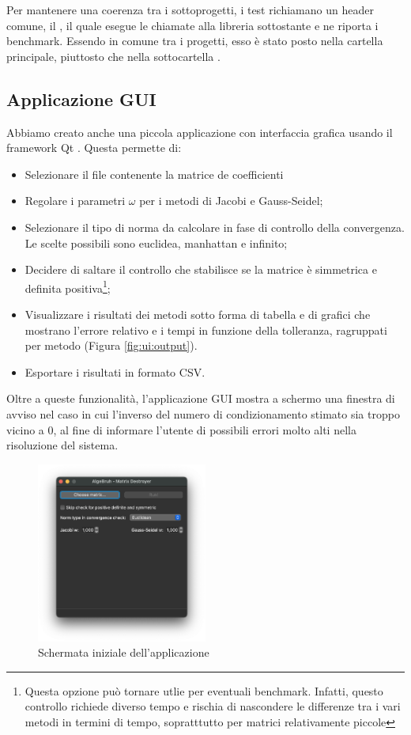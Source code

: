 Per mantenere una coerenza tra i sottoprogetti, i test richiamano un header comune, il , il quale esegue le chiamate alla libreria sottostante e ne riporta i benchmark. Essendo in comune tra i progetti, esso è stato posto nella cartella principale, piuttosto che nella sottocartella .


\subsection{Applicazione GUI}
Abbiamo creato anche una piccola applicazione con interfaccia grafica usando il framework Qt \cite{Qt}. Questa permette di:
\begin{itemize}
	\item Selezionare il file contenente la matrice de coefficienti
	\item Regolare i parametri $\omega$ per i metodi di Jacobi e Gauss-Seidel;
	\item Selezionare il tipo di norma da calcolare in fase di controllo della convergenza. Le scelte possibili sono euclidea, manhattan e infinito;
	\item Decidere di saltare il controllo che stabilisce se la matrice è simmetrica e definita positiva\footnote{Questa opzione può tornare utlie per eventuali benchmark. Infatti, questo controllo richiede diverso tempo e rischia di nascondere le differenze tra i vari metodi in termini di tempo, sopratttutto per matrici relativamente piccole};
	\item Visualizzare i risultati dei metodi sotto forma di tabella e di grafici che mostrano l'errore relativo e i tempi in funzione della tolleranza, ragruppati per metodo (Figura \ref{fig:ui:output}).
	\item Esportare i risultati in formato CSV.
\end{itemize}

Oltre a queste funzionalità, l'applicazione GUI mostra a schermo una finestra di avviso nel caso in cui l'inverso del  numero di condizionamento stimato sia troppo vicino a 0, al fine di informare l'utente di possibili errori molto alti nella risoluzione del sistema.

\begin{figure}%
	\centering
	\includegraphics[width=0.5\textwidth]{figures/UI/main.png}
	\caption{Schermata iniziale dell'applicazione}%
	\label{fig:ui:main}%
\end{figure}

